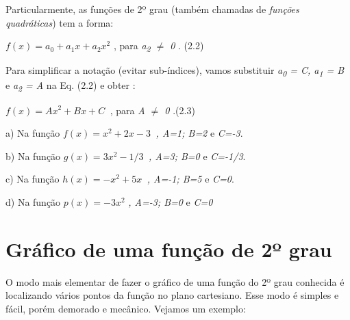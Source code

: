 Particularmente, as funções de 2º grau (também chamadas de \textit{funções quadráticas}) tem a forma:  

 \( f \left( x \right) =a_{0}+a_{1}x+a_{2}x^{2} \) , para    \textit{a\textsubscript{2} $ \neq $  0  }. (2.2)

Para simplificar a notação (evitar sub-índices), vamos substituir \textit{a\textsubscript{0} = C,   a\textsubscript{1} = B}    e    \textit{a\textsubscript{2} = A}   na Eq. (2.2) e obter :

 \( f \left( x \right) =Ax^{2}+Bx+C_{~ } \) , para \textit{A $ \neq $  0  }.\tab (2.3)

\begin{texemplo}
a) Na função  \( f \left( x \right) =x^{2}+2x-3_{~ } \)  \textit{, A=1; B=2 }e\textit{ C=-3}.

b) Na função  \( g \left( x \right) =3x^{2}-1/3_{~ } \)  \textit{, A=3; B=0 }e\textit{ C=-1/3}.

c) Na função  \( h \left( x \right) =-x^{2}+5x_{~ } \)  \textit{, A=-1; B=5 }e\textit{ C=0}.

d) Na função  \( p \left( x \right) =-3x^{2}_{~ } \)  \textit{, A=-3; B=0 }e\textit{ C=0 }\qedsymbol{}
\end{texemplo}

\section{Gráfico de uma função de 2º grau}

O modo mais elementar de fazer o gráfico de uma função do 2º grau conhecida é localizando vários pontos da função no plano cartesiano. Esse modo é simples e fácil, porém demorado e mecânico. Vejamos um exemplo:

